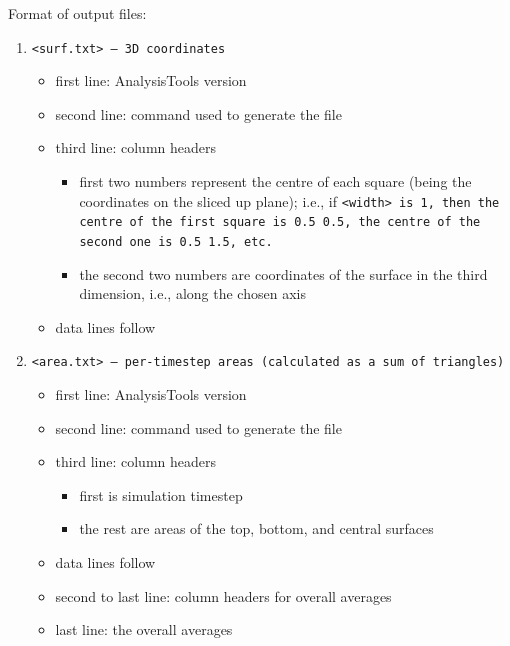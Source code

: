 \noindent
Format of output files:
\begin{enumerate}[nosep,leftmargin=20pt]
  \item \tt{<surf.txt>} -- 3D coordinates
    \begin{itemize}[nosep,leftmargin=5pt]
      \item first line: AnalysisTools version
      \item second line: command used to generate the file
      \item third line: column headers
        \begin{itemize}[nosep,leftmargin=5pt]
          \item first two numbers represent the centre of each square
            (being the coordinates on the sliced up plane); i.e., if
            \tt{<width>} is 1, then the centre of the first square is 0.5 0.5,
            the centre of
            the second one is 0.5 1.5, etc.
          \item the second two numbers are coordinates of the surface in
            the third dimension, i.e., along the chosen axis
        \end{itemize}
        \item data lines follow
    \end{itemize}
  \item \tt{<area.txt>} -- per-timestep areas (calculated as a sum of triangles)
    \begin{itemize}[nosep,leftmargin=5pt]
      \item first line: AnalysisTools version
      \item second line: command used to generate the file
      \item third line: column headers
        \begin{itemize}[nosep,leftmargin=5pt]
          \item first is simulation timestep
          \item the rest are areas of the top, bottom, and central surfaces
        \end{itemize}
        \item data lines follow
        \item second to last line: column headers for overall averages
        \item last line: the overall averages
    \end{itemize}
\end{enumerate}
